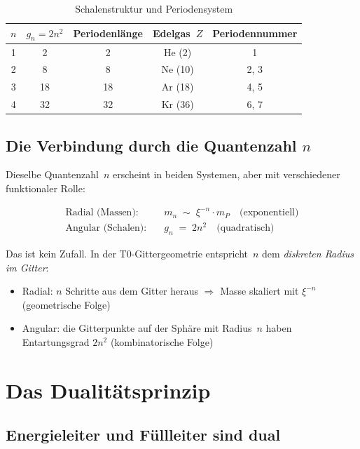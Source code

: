 \begin{table}[htbp]
\centering
\caption{Schalenstruktur und Periodensystem}
\label{tab:schalen}
\begin{tabular}{ccccc}
\hline
$n$ & $g_n = 2n^2$ & Periodenlänge & Edelgas~$Z$ & Periodennummer \\
\hline
1 &  2 &  2 &  He (2)  & 1 \\
2 &  8 &  8 &  Ne (10) & 2, 3 \\
3 & 18 & 18 &  Ar (18) & 4, 5 \\
4 & 32 & 32 &  Kr (36) & 6, 7 \\
\hline
\end{tabular}
\end{table}

\subsection{Die Verbindung durch die Quantenzahl \texorpdfstring{$n$}{n}}
\label{subsec:verbindung-n}

Dieselbe Quantenzahl~$n$ erscheint in beiden Systemen, aber mit
verschiedener funktionaler Rolle:

\begin{align}
  \text{Radial (Massen):}  &\quad m_n \;\sim\; \xi^{-n} \cdot m_P
    \quad\text{(exponentiell)} \\
  \text{Angular (Schalen):}&\quad g_n \;=\; 2n^2
    \quad\text{(quadratisch)}
\end{align}

Das ist kein Zufall. In der T0-Gittergeometrie entspricht~$n$ dem
\emph{diskreten Radius im Gitter}:
\begin{itemize}
  \item Radial: $n$ Schritte aus dem Gitter heraus $\Rightarrow$
    Masse skaliert mit $\xi^{-n}$ (geometrische Folge)
  \item Angular: die Gitterpunkte auf der Sphäre mit Radius~$n$ haben
    Entartungsgrad $2n^2$ (kombinatorische Folge)
\end{itemize}

\section{Das Dualitätsprinzip}
\label{sec:dualitaet}

\subsection{Energieleiter und Füllleiter sind dual}
\label{subsec:dual}

